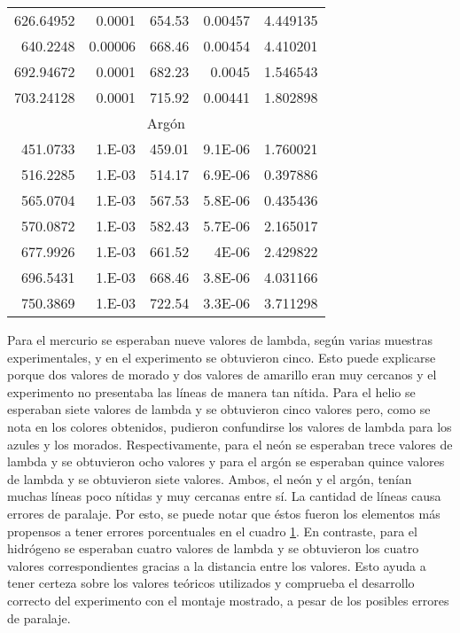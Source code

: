 \documentclass[%
 reprint,
 amsmath,amssymb,
 aps,
]{revtex4-1}
\begin{document}
\begin{table}[H]
\begin{tabular}{|r|r|r|r|r|}
    626.64952 & 0.0001 & 654.53 & 0.00457 & 4.449135 \\
    640.2248 & 0.00006 & 668.46 & 0.00454 & 4.410201 \\
    692.94672 & 0.0001 & 682.23 & 0.0045 & 1.546543 \\
    703.24128 & 0.0001 & 715.92 & 0.00441 & 1.802898 \\
    \hline
    \multicolumn{5}{|c|}{Argón} \\
    \hline
    451.0733 & 1.E-03 & 459.01 & 9.1E-06 & 1.760021 \\
    516.2285 & 1.E-03 & 514.17 & 6.9E-06 & 0.397886 \\
    565.0704 & 1.E-03 & 567.53 & 5.8E-06 & 0.435436 \\
    570.0872 & 1.E-03 & 582.43 & 5.7E-06 & 2.165017 \\
    677.9926 & 1.E-03 & 661.52 & 4E-06 & 2.429822 \\
    696.5431 & 1.E-03 & 668.46 & 3.8E-06 & 4.031166 \\
    750.3869 & 1.E-03 & 722.54 & 3.3E-06 & 3.711298 \\
    \hline
    \end{tabular}%
  \label{tab:18}%
\end{table}%

Para el mercurio se esperaban nueve valores de lambda, según varias muestras experimentales, y en el experimento se obtuvieron cinco. Esto puede explicarse porque dos valores de morado y dos valores de amarillo eran muy cercanos y el experimento no presentaba las líneas de manera tan nítida. Para el helio se esperaban siete valores de lambda y se obtuvieron cinco valores pero, como se nota en los colores obtenidos, pudieron confundirse los valores de lambda para los azules y los morados. Respectivamente, para el neón se esperaban trece valores de lambda y se obtuvieron ocho valores y para el argón se esperaban quince valores de lambda y se obtuvieron siete valores. Ambos, el neón y el argón, tenían muchas líneas poco nítidas y muy cercanas entre sí. La cantidad de líneas causa errores de paralaje. Por esto, se puede notar que éstos fueron los elementos más propensos a tener errores porcentuales en el cuadro \ref{tab:18}. En contraste, para el hidrógeno se esperaban cuatro valores de lambda y se obtuvieron los cuatro valores correspondientes gracias a la distancia entre los valores. Esto ayuda a tener certeza sobre los valores teóricos utilizados y comprueba el desarrollo correcto del experimento con el montaje mostrado, a pesar de los posibles errores de paralaje.
\end{document}
